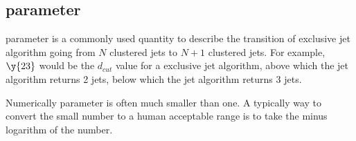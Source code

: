 \subsection{\y{} parameter}
\y{} parameter is a commonly used quantity to describe the transition of exclusive jet algorithm going from $N$ clustered jets to $N\!+\!1$ clustered jets. For example, $\y{23}$ would be the $d_{cut}$ value for a exclusive jet algorithm, above which the jet algorithm returns 2 jets, below which the jet algorithm returns 3 jets.

Numerically \y{} parameter is often much smaller than one. A typically way to convert the small number to a human acceptable range is to take the minus logarithm of the number.

